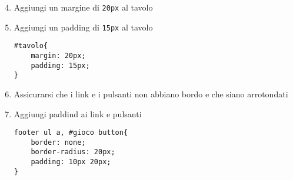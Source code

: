 \begin{frame}[fragile]\transfade
  \begin{sol}\centering
    \begin{enumerate}
      \setcounter{enumi}{3}
      \item Aggiungi un margine di \texttt{20px} al tavolo
      \item Aggiungi un padding di \texttt{15px} al tavolo
      \begin{verbatim}
#tavolo{
    margin: 20px;
    padding: 15px;
}
      \end{verbatim}
    \item Assicurarsi che i link e i pulsanti non abbiano bordo e che siano arrotondati
    \item Aggiungi paddind ai link e pulsanti
    \begin{verbatim}
footer ul a, #gioco button{
    border: none;
    border-radius: 20px;
    padding: 10px 20px;
}
    \end{verbatim}
    \end{enumerate}
  \end{sol}
\end{frame}